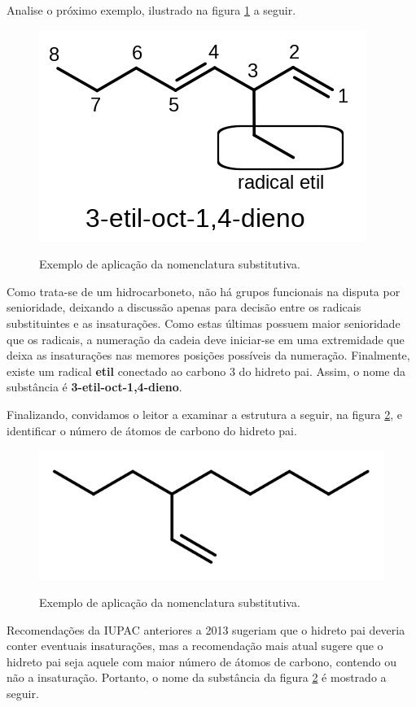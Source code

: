 \documentclass[a4paper,12pt]{book}
\begin{document}
Analise o próximo exemplo, ilustrado na figura \ref{fig:octadieno} a seguir.

\begin{figure}[h]
	\centering
	\caption{Exemplo de aplicação da nomenclatura substitutiva.}
	\vspace{0.5cm}
	\includegraphics[width=0.6\linewidth]{imagens/octadieno.png}
\label{fig:octadieno}
\end{figure}

Como trata-se de um hidrocarboneto, não há grupos funcionais na disputa por senioridade, deixando a discussão apenas para decisão entre os radicais substituintes e as insaturações. Como estas últimas possuem maior senioridade que os radicais, a numeração da cadeia deve iniciar-se em uma extremidade que deixa as insaturações nas memores posições possíveis da numeração. Finalmente, existe um radical \textbf{etil} conectado ao carbono 3 do hidreto pai. Assim, o nome da substância é \textbf{3-etil-oct-1,4-dieno}. 

Finalizando, convidamos o leitor a examinar a estrutura a seguir, na figura \ref{fig:etenil}, e identificar o número de átomos de carbono do hidreto pai.

\begin{figure}[h]
	\centering
	\caption{Exemplo de aplicação da nomenclatura substitutiva.}
	\vspace{0.5cm}
	\includegraphics[width=0.6\linewidth]{imagens/etenil.png}
\label{fig:etenil}
\end{figure}

Recomendações da IUPAC anteriores a 2013 sugeriam que o hidreto pai deveria conter eventuais insaturações, mas a recomendação mais atual sugere que o hidreto pai seja aquele com maior número de átomos de carbono, contendo ou não a insaturação. Portanto, o nome da substância da figura \ref{fig:etenil} é mostrado a seguir.
\end{document}
